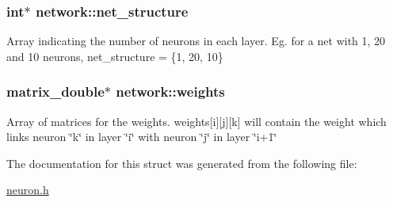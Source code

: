 \subsubsection[{net\+\_\+structure}]{\setlength{\rightskip}{0pt plus 5cm}int$\ast$ network\+::net\+\_\+structure}\label{structnetwork_a127a5087949957286cd3d7ac0b27edb4}
Array indicating the number of neurons in each layer. Eg. for a net with 1, 20 and 10 neurons, net\+\_\+structure = \{1, 20, 10\} \hypertarget{structnetwork_aedd3f7e4b716b6f9cdd75a956f1f8af4}{}
\subsubsection[{weights}]{\setlength{\rightskip}{0pt plus 5cm}matrix\+\_\+double$\ast$ network\+::weights}\label{structnetwork_aedd3f7e4b716b6f9cdd75a956f1f8af4}
Array of matrices for the weights. weights\mbox{[}i\mbox{]}\mbox{[}j\mbox{]}\mbox{[}k\mbox{]} will contain the weight which links neuron \char`\"{}k\char`\"{} in layer \char`\"{}i\char`\"{} with neuron \char`\"{}j\char`\"{} in layer \char`\"{}i+1\char`\"{} 

The documentation for this struct was generated from the following file\+:\begin{DoxyCompactItemize}
\item 
\hyperlink{neuron_8h}{neuron.\+h}\end{DoxyCompactItemize}
